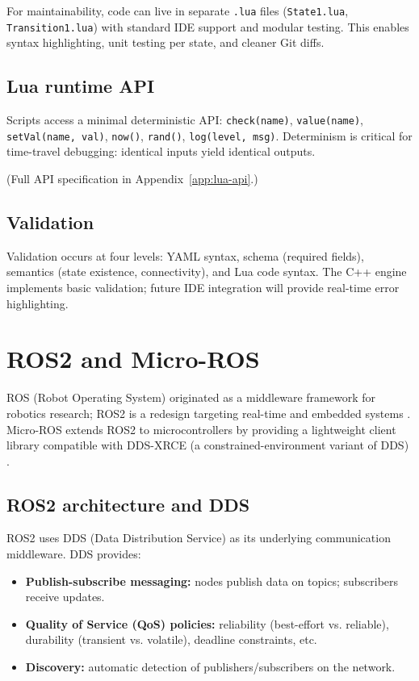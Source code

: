 For maintainability, code can live in separate \texttt{.lua} files (\texttt{State1.lua}, \texttt{Transition1.lua}) with standard IDE support and modular testing.
This enables syntax highlighting, unit testing per state, and cleaner Git diffs.

\subsection{Lua runtime API}

Scripts access a minimal deterministic API: \texttt{check(name)}, \texttt{value(name)}, \texttt{setVal(name, val)}, \texttt{now()}, \texttt{rand()}, \texttt{log(level, msg)}.
Determinism is critical for time-travel debugging: identical inputs yield identical outputs.

(Full API specification in Appendix~\ref{app:lua-api}.)

\subsection{Validation}

Validation occurs at four levels: YAML syntax, schema (required fields), semantics (state existence, connectivity), and Lua code syntax.
The C++ engine implements basic validation; future IDE integration will provide real-time error highlighting.

\section{ROS2 and Micro-ROS}

ROS (Robot Operating System) originated as a middleware framework for robotics research; ROS2 is a redesign targeting real-time and embedded systems \cite{ROS2}.
Micro-ROS extends ROS2 to microcontrollers by providing a lightweight client library compatible with DDS-XRCE (a constrained-environment variant of DDS) \cite{MicroROS}.

\subsection{ROS2 architecture and DDS}

ROS2 uses DDS (Data Distribution Service) as its underlying communication middleware.
DDS provides:
\begin{itemize}
  \item \textbf{Publish-subscribe messaging:} nodes publish data on topics; subscribers receive updates.
  \item \textbf{Quality of Service (QoS) policies:} reliability (best-effort vs. reliable), durability (transient vs. volatile), deadline constraints, etc.
  \item \textbf{Discovery:} automatic detection of publishers/subscribers on the network.
\end{itemize}


